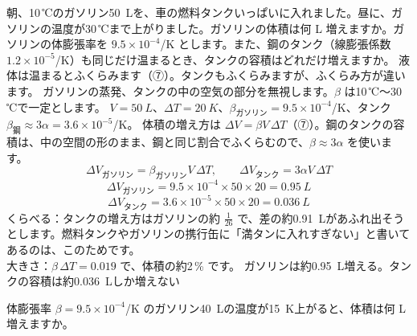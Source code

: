 \label{ph:熱-1:ex8}
\begin{phreidai}
朝、10\,℃のガソリン\qty{50}{L}を、車の燃料タンクいっぱいに入れました。昼に、ガソリンの温度が30\,℃まで上がりました。ガソリンの体積は何 L 増えますか。ガソリンの体膨張率を $9.5\times10^{-4}$/K とします。また、鋼のタンク（線膨張係数 $1.2\times10^{-5}$/K）も同じだけ温まるとき、タンクの容積はどれだけ増えますか。
\phbamen
液体は温まるとふくらみます（⑦）。タンクもふくらみますが、ふくらみ方が違います。
\phmushi
ガソリンの蒸発、タンクの中の空気の部分を無視します。$\beta$ は10\,℃〜30\,℃で一定とします。
\phzu
$V=\qty{50}{L}$、$\Delta T=\qty{20}{K}$、$\beta_{\text{ガソリン}}=9.5\times10^{-4}$/K、タンク $\beta_{\text{鋼}}\approx3\alpha=3.6\times10^{-5}$/K。
\phriyu
体積の増え方は $\Delta V=\beta V\,\Delta T$（⑦）。鋼のタンクの容積は、中の空間の形のまま、鋼と同じ割合でふくらむので、$\beta\approx3\alpha$ を使います。
\phtateru
\[\Delta V_{\text{ガソリン}}=\beta_{\text{ガソリン}}V\,\Delta T,\qquad \Delta V_{\text{タンク}}=3\alpha V\,\Delta T\]
\phtoku
\[\Delta V_{\text{ガソリン}}=9.5\times10^{-4}\times50\times20=\qty{0.95}{L}\]
\[\Delta V_{\text{タンク}}=3.6\times10^{-5}\times50\times20=\qty{0.036}{L}\]
\phtashikame
くらべる：タンクの増え方はガソリンの約 $\tfrac{1}{26}$ で、差の約\qty{0.91}{L}があふれ出そうとします。燃料タンクやガソリンの携行缶に「満タンに入れすぎない」と書いてあるのは、このためです。\\
大きさ：$\beta\,\Delta T=0.019$ で、体積の約2\,\% です。
\kotae ガソリンは約\qty{0.95}{L}増える。タンクの容積は約\qty{0.036}{L}しか増えない
\end{phreidai}
\begin{jibun}
体膨張率 $\beta=9.5\times10^{-4}$/K のガソリン\qty{40}{L}の温度が\qty{15}{K}上がると、体積は何 L 増えますか。
\end{jibun}

